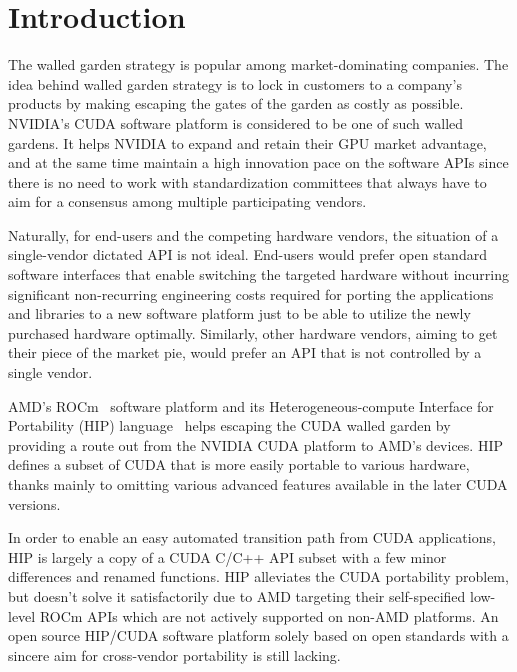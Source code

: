 \documentclass[Afour,sageh,times]{sagej}
\newcommand{\mycite}[1]{\citep{#1}}
\begin{document}

\maketitle

\section{Introduction}

\noindent The walled garden strategy is popular among market-dominating companies. The idea behind walled garden strategy is to lock in customers to a company's products by making escaping the gates of the garden as costly as possible. NVIDIA's CUDA software platform is considered to be one of such walled gardens. It helps NVIDIA to expand and retain their GPU market advantage, and at the same time maintain a high innovation pace on the software APIs since there is no need to work with standardization committees that always have to aim for a consensus among multiple participating vendors.

Naturally, for end-users and the competing hardware vendors, the situation of a single-vendor dictated API is not ideal. End-users would prefer open standard software interfaces that enable switching the targeted hardware without incurring significant non-recurring engineering costs required for porting the applications and libraries to a new software platform just to be able to utilize the newly purchased hardware optimally. Similarly, other hardware vendors, aiming to get their piece of the market pie, would prefer an API that is not controlled by a single vendor.

AMD's ROCm~\mycite{ROCm} software platform and its Heterogeneous-compute Interface for Portability (HIP) language~\mycite{hip} helps escaping the CUDA walled garden by providing a route out from the NVIDIA CUDA platform to AMD's devices. HIP defines a subset of CUDA that is more easily portable to various hardware, thanks mainly to omitting various advanced features available in the later CUDA versions.

In order to enable an easy automated transition path from CUDA applications, HIP is largely a copy of a CUDA C/C++ API subset with a few minor differences and renamed functions. HIP alleviates the CUDA portability problem, but doesn't solve it satisfactorily due to AMD targeting their self-specified low-level ROCm APIs which are not actively supported on non-AMD platforms.
An open source HIP/CUDA software platform solely based on open standards with a sincere aim for cross-vendor portability is still lacking.
\end{document}
